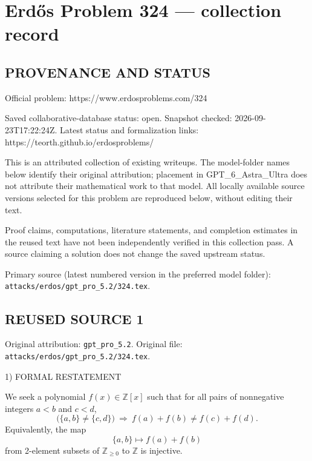 \section*{Erd\H{o}s Problem 324 --- collection record}

\subsection*{PROVENANCE AND STATUS}
Official problem: https://www.erdosproblems.com/324

Saved collaborative-database status: open.
Snapshot checked: 2026-09-23T17:22:24Z.
Latest status and formalization links: https://teorth.github.io/erdosproblems/

This is an attributed collection of existing writeups. The model-folder names below identify their original attribution; placement in GPT\_6\_Astra\_Ultra does not attribute their mathematical work to that model. All locally available source versions selected for this problem are reproduced below, without editing their text.

Proof claims, computations, literature statements, and completion estimates in the reused text have not been independently verified in this collection pass. A source claiming a solution does not change the saved upstream status.

Primary source (latest numbered version in the preferred model folder): \texttt{attacks/erdos/gpt\_pro\_5.2/324.tex}.

\subsection*{REUSED SOURCE 1}
Original attribution: \texttt{gpt\_pro\_5.2}.
Original file: \texttt{attacks/erdos/gpt\_pro\_5.2/324.tex}.


1) FORMAL RESTATEMENT

We seek a polynomial $f(x)\in\mathbb Z[x]$ such that for all pairs of nonnegative integers $a<b$ and $c<d$,
\[
\bigl(\{a,b\}\neq\{c,d\}\bigr)\ \Longrightarrow\ f(a)+f(b)\neq f(c)+f(d).
\]
Equivalently, the map
\[
\{a,b\}\mapsto f(a)+f(b)
\]
from 2-element subsets of $\mathbb Z_{\ge 0}$ to $\mathbb Z$ is injective.

